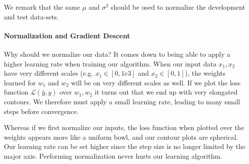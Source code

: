 \documentclass[12pt]{article}
\begin{document}
We remark that the same $\mu$ and $\sigma^2$ should be used to normalize the development and test data-sets.

\paragraph{Normalization and Gradient Descent} Why should we normalize our data? It comes down to being able to apply a higher learning rate when training our algorithm. When our input data $x_1, x_2$ have very different scales (e.g. $x_1 \in [0, 1e3]$ and $x_2 \in [0,1]$), the weights learned for $w_1$ and $w_2$ will be on very different scales as well. If we plot the loss function $\mathcal L(\hat y, y)$ over $w_1, w_2$ it turns out that we end up with very elongated contours. We therefore must apply a small learning rate, leading to many small steps before convergence.

\begin{minipage}{1.0\textwidth} \begin{multicols}{2}  
\vfill\null \columnbreak
{}
\end{multicols} \end{minipage}

Whereas if we first normalize our inputs, the loss function when plotted over the weights appears more like a uniform bowl, and our contour plots are spherical. Our learning rate can be set higher since the step size is no longer limited by the major axis. Performing normalization never hurts our learning algorithm.
\end{document}
